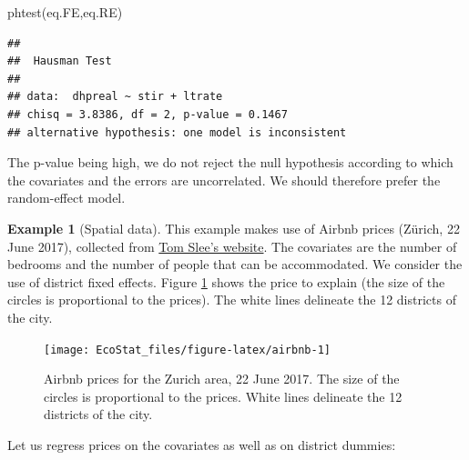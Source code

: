 \documentclass[
  12pt,
]{book}
\newenvironment{Shaded}{\begin{snugshade}}{\end{snugshade}}
\newcommand{\FunctionTok}[1]{\textcolor[rgb]{0.00,0.00,0.00}{#1}}
\newcommand{\NormalTok}[1]{#1}
\theoremstyle{definition}
\theoremstyle{definition}
\newtheorem{example}{Example}[chapter]
\theoremstyle{definition}
\theoremstyle{definition}
\theoremstyle{remark}
\begin{document}
\begin{Shaded}
\begin{Highlighting}[]
\FunctionTok{phtest}\NormalTok{(eq.FE,eq.RE)}
\end{Highlighting}
\end{Shaded}

\begin{verbatim}
## 
##  Hausman Test
## 
## data:  dhpreal ~ stir + ltrate
## chisq = 3.8386, df = 2, p-value = 0.1467
## alternative hypothesis: one model is inconsistent
\end{verbatim}

The p-value being high, we do not reject the null hypothesis according to which the covariates and the errors are uncorrelated. We should therefore prefer the random-effect model.

\begin{example}[Spatial data]
\protect\hypertarget{exm:airbnb}{}\label{exm:airbnb}This example makes use of Airbnb prices (Zürich, 22 June 2017), collected from \href{http://tomslee.net/airbnb-data-collection-get-the-data}{Tom Slee's website}. The covariates are the number of bedrooms and the number of people that can be accommodated. We consider the use of district fixed effects. Figure \ref{fig:airbnb} shows the price to explain (the size of the circles is proportional to the prices). The white lines delineate the 12 districts of the city.

\begin{figure}
\texttt{[image: EcoStat\_files/figure-latex/airbnb-1]} \caption{Airbnb prices for the Zurich area, 22 June 2017. The size of the circles is proportional to the prices. White lines delineate the 12 districts of the city.}\label{fig:airbnb}
\end{figure}

Let us regress prices on the covariates as well as on district dummies:


\end{example}
\end{document}
